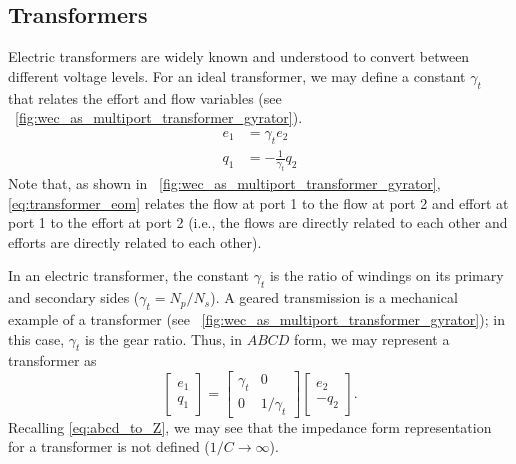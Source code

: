 \documentclass[lettersize,journal]{IEEEtran}
\begin{document}
\subsection{Transformers}\label{sec:trasnformers}
Electric transformers are widely known and understood to convert between different voltage levels.
For an ideal transformer, we may define a constant $\gamma_{t}$ that relates the effort and flow variables (see \figurename~\ref{fig:wec_as_multiport_transformer_gyrator}).
%
\begin{subequations}
        \begin{align}
               e_1 &= \gamma_{t} e_2 \\
               q_1 &= -\frac{1}{\gamma_t} q_2
        \end{align}
        \label{eq:transformer_eom}%
\end{subequations}
%
Note that, as shown in \figurename~\ref{fig:wec_as_multiport_transformer_gyrator}, \eqref{eq:transformer_eom} relates the flow at port 1 to the flow at port 2 and effort at port 1 to the effort at port 2 (i.e., the flows are directly related to each other and efforts are directly related to each other).

In an electric transformer, the constant $\gamma_t$ is the ratio of windings on its primary and secondary sides ($\gamma_t=N_p/N_s$).
A geared transmission is a mechanical example of a transformer (see \figurename~\ref{fig:wec_as_multiport_transformer_gyrator}); in this case, $\gamma_{t}$ is the gear ratio.
Thus, in $ABCD$ form, we may represent a transformer as
%
\begin{equation}
        \begin{bmatrix}
                e_1 \\ q_1
        \end{bmatrix}
        =
        \begin{bmatrix}
                \gamma_{t} & 0 \\ 0 & 1/\gamma_{t}
        \end{bmatrix}
        \begin{bmatrix}
                e_2 \\ - q_2
        \end{bmatrix} .
        \label{eq:transformer_abcd}
\end{equation}
%
Recalling \eqref{eq:abcd_to_Z}, we may see that the impedance form representation for a transformer is not defined ($1/C \rightarrow \infty$).
\end{document}
